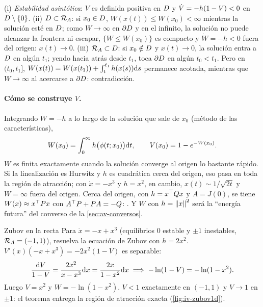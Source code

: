 \begin{demostracion}[Esbozo]
(i) \emph{Estabilidad asintótica}: $V$ es definida positiva en $D$ y $\dot V=-h(1-V)<0$ en $D\setminus\{0\}$. (ii) \emph{$D\subset\mathcal{R}_A$}: si $x_0\in D$, $W(x(t))\le W(x_0)<\infty$ mientras la solución esté en $D$; como $W\to\infty$ en $\partial D$ y en el infinito, la solución no puede alcanzar la frontera ni escapar, $\{W\le W(x_0)\}$ es compacto y $\dot W=-h<0$ fuera del origen: $x(t)\to0$. (iii) \emph{$\mathcal{R}_A\subset D$}: si $x_0\notin D$ y $x(t)\to0$, la solución entra a $D$ en algún $t_1$; yendo hacia atrás desde $t_1$, toca $\partial D$ en algún $t_0<t_1$. Pero en $(t_0,t_1]$, $W(x(t))=W(x(t_1))+\int_t^{t_1}h(x(s))\mathrm{d} s$ permanece acotada, mientras que $W\to\infty$ al acercarse a $\partial D$: contradicción.
\end{demostracion}

\paragraph{Cómo se construye $V$.} Integrando $\dot W=-h$ a lo largo de la solución que sale de $x_0$ (método de las características),
\begin{equation}
  W(x_0)=\int_0^\infty h\bigl(\phi(t;x_0)\bigr)\mathrm{d} t,\qquad V(x_0)=1-e^{-W(x_0)} .
  \label{eq:iv-caracteristicas}
\end{equation}
$W$ es finita exactamente cuando la solución converge al origen lo bastante rápido. Si la linealización es Hurwitz y $h$ es cuadrática cerca del origen, eso pasa en toda la región de atracción; con $\dot x=-x^3$ y $h=x^2$, en cambio, $x(t)\sim1/\sqrt{2t}$ y $W=\infty$ fuera del origen. Cerca del origen, con $h=x^{\top} Qx$ y $A=J(0)$, se tiene $W(x)\approx x^{\top} Px$ con $A^{\top} P+PA=-Q$: . Y $W$ con $h=\left\lVert x\right\rVert^2$ será la ``energía futura'' del converso de la \cref{sec:av-conversos}.

\begin{ejemplo}[label=ej:iv-z1]{Zubov en la recta}
Para $\dot x=-x+x^3$ (equilibrios $0$ estable y $\pm1$ inestables, $\mathcal{R}_A=(-1,1)$), resuelva la ecuación de Zubov con $h=2x^2$.
\solucion $V'(x)(-x+x^3)=-2x^2(1-V)$ es separable:
\[
  \frac{\mathrm{d} V}{1-V}=\frac{2x^2}{x-x^3}\mathrm{d} x=\frac{2x}{1-x^2}\mathrm{d} x\;\Longrightarrow\;-\ln(1-V)=-\ln(1-x^2) .
\]
Luego $V=x^2$ y $W=-\ln(1-x^2)$. $V<1$ exactamente en $(-1,1)$ y $V\to1$ en $\pm1$: el teorema entrega la región de atracción exacta (\cref{fig:iv-zubov1d}).
\end{ejemplo}

